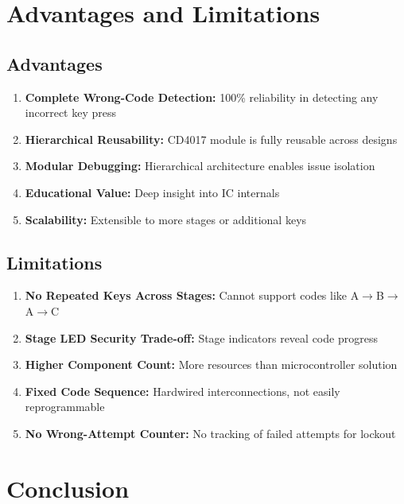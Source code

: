 \documentclass[12pt,a4paper]{report}
\begin{document}
\chapter{Advantages and Limitations}

\section{Advantages}

\begin{enumerate}
    \item \textbf{Complete Wrong-Code Detection:} 100\% reliability in detecting any incorrect key press
    \item \textbf{Hierarchical Reusability:} CD4017 module is fully reusable across designs
    \item \textbf{Modular Debugging:} Hierarchical architecture enables issue isolation
    \item \textbf{Educational Value:} Deep insight into IC internals
    \item \textbf{Scalability:} Extensible to more stages or additional keys
\end{enumerate}

\section{Limitations}

\begin{enumerate}
    \item \textbf{No Repeated Keys Across Stages:} Cannot support codes like A$\rightarrow$B$\rightarrow$A$\rightarrow$C
    \item \textbf{Stage LED Security Trade-off:} Stage indicators reveal code progress
    \item \textbf{Higher Component Count:} More resources than microcontroller solution
    \item \textbf{Fixed Code Sequence:} Hardwired interconnections, not easily reprogrammable
    \item \textbf{No Wrong-Attempt Counter:} No tracking of failed attempts for lockout
\end{enumerate}

\chapter{Conclusion}
\end{document}
